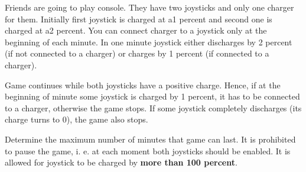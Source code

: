 Friends are going to play console. They have two joysticks and only one charger for them.
Initially first joystick is charged at a1 percent and second one is charged at a2 percent. You
can connect charger to a joystick only at the beginning of each minute. In one minute joystick
either discharges by 2 percent (if not connected to a charger) or charges by 1 percent (if
connected to a charger).

Game continues while both joysticks have a positive charge. Hence, if at the beginning of
minute some joystick is charged by 1 percent, it has to be connected to a charger, otherwise
the game stops. If some joystick completely discharges (its charge turns to 0), the game also
stops.

Determine the maximum number of minutes that game can last. It is prohibited to pause the game,
i. e. at each moment both joysticks should be enabled. It is allowed for joystick to be charged
by \textbf{more than 100 percent}.
